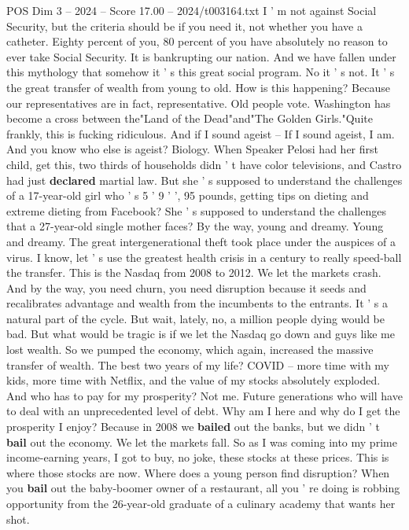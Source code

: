 \begin{textsample}{POS Dim 3 – 2024 – Score 17.00 – 2024/t003164.txt}
I ' m not against Social Security, but the criteria should be if you need it, not whether you have a catheter.
Eighty percent of you, 80 percent of you have absolutely no reason to ever take Social Security.
It is bankrupting our nation.
And we have fallen under this mythology that somehow it ' s this great social program.
No it ' s not.
It ' s the great transfer of wealth from young to old.
How is this happening?
Because our representatives are in fact, representative.
Old people vote.
Washington has become a cross between the"Land of the Dead"and"The Golden Girls."Quite frankly, this is fucking ridiculous.
And if I sound ageist -- If I sound ageist, I am.
And you know who else is ageist?
Biology.
When Speaker Pelosi had her first child, get this, two thirds of households didn ' t have color televisions, and Castro had just \textbf{declared} martial law.
But she ' s supposed to understand the challenges of a 17-year-old girl who ' s 5 ' 9 ' ', 95 pounds, getting tips on dieting and extreme dieting from Facebook?
She ' s supposed to understand the challenges that a 27-year-old single mother faces?
By the way, young and dreamy.
Young and dreamy.
The great intergenerational theft took place under the auspices of a virus.
I know, let ' s use the greatest health crisis in a century to really speed-ball the transfer.
This is the Nasdaq from 2008 to 2012.
We let the markets crash.
And by the way, you need churn, you need disruption because it seeds and recalibrates advantage and wealth from the incumbents to the entrants.
It ' s a natural part of the cycle.
But wait, lately, no, a million people dying would be bad.
But what would be tragic is if we let the Nasdaq go down and guys like me lost wealth.
So we pumped the economy, which again, increased the massive transfer of wealth.
The best two years of my life?
COVID -- more time with my kids, more time with Netflix, and the value of my stocks absolutely exploded.
And who has to pay for my prosperity?
Not me.
Future generations who will have to deal with an unprecedented level of debt.
Why am I here and why do I get the prosperity I enjoy?
Because in 2008 we \textbf{bailed} out the banks, but we didn ' t \textbf{bail} out the economy.
We let the markets fall.
So as I was coming into my prime income-earning years, I got to buy, no joke, these stocks at these prices.
This is where those stocks are now.
Where does a young person find disruption?
When you \textbf{bail} out the baby-boomer owner of a restaurant, all you ' re doing is robbing opportunity from the 26-year-old graduate of a culinary academy that wants her shot.

\end{textsample}
